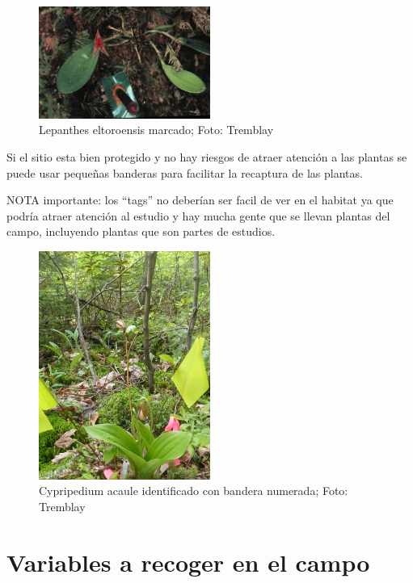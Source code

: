 \documentclass[
]{book}
\theoremstyle{definition}
\theoremstyle{definition}
\theoremstyle{definition}
\theoremstyle{definition}
\theoremstyle{remark}
\begin{document}
\begin{figure}
\centering
\includegraphics[width=0.5\textwidth,height=\textheight]{Figures/Lep_eltoroensis.png}
\caption{Lepanthes eltoroensis marcado; Foto: Tremblay}
\end{figure}

Si el sitio esta bien protegido y no hay riesgos de atraer atención a las plantas se puede usar pequeñas banderas para facilitar la recaptura de las plantas.

NOTA importante: los ``tags'' no deberían ser facil de ver en el habitat ya que podría atraer atención al estudio y hay mucha gente que se llevan plantas del campo, incluyendo plantas que son partes de estudios.

\begin{figure}
\centering
\includegraphics[width=0.5\textwidth,height=\textheight]{Figures/Cyp_acaule_flag.jpg}
\caption{Cypripedium acaule identificado con bandera numerada; Foto: Tremblay}
\end{figure}

\hypertarget{variables-a-recoger-en-el-campo}{%
\section{Variables a recoger en el campo}\label{variables-a-recoger-en-el-campo}}
\end{document}
